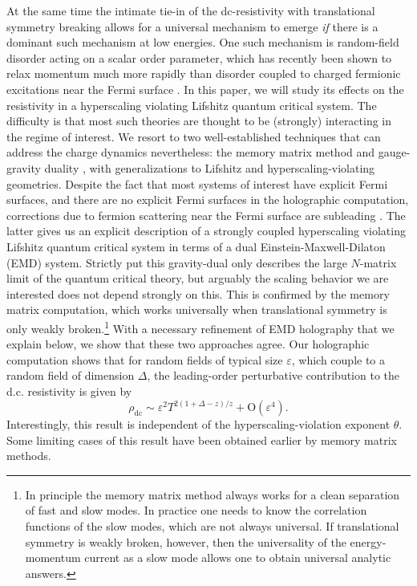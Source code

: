 \documentclass[10pt, oneside]{book}
\begin{document}
\begin{doublespace}
At the same time the intimate tie-in of the dc-resistivity with translational symmetry breaking allows for a universal mechanism to emerge {\em if} there is a dominant such mechanism at low energies. One such mechanism is random-field disorder acting on a scalar order parameter, which has recently been shown to relax momentum much more rapidly than disorder coupled to charged fermionic excitations near the Fermi surface \cite{Hartnoll:2014gba}. In this paper, we will study its effects on the resistivity in a hyperscaling violating Lifshitz quantum critical system. The difficulty is that most such theories are thought to be (strongly) interacting in the regime of interest. We resort to two well-established techniques that can address the charge dynamics nevertheless: the memory matrix method \cite{forster1995} and gauge-gravity duality \cite{Hartnoll:2009sz, McGreevy:2009xe, Sachdev:2011wg}, with generalizations to Lifshitz \cite{Kachru:2008yh} and hyperscaling-violating \cite{Gubser:2009qt,Charmousis:2010zz,Iizuka:2011hg,Huijse:2011ef,Dong:2012se} geometries.  Despite the fact that most systems of
interest have explicit Fermi surfaces, and there are no
explicit Fermi surfaces in the holographic computation,
corrections due to fermion scattering near the Fermi surface
are subleading \cite{Hartnoll:2014gba}. The latter gives us an explicit description of a strongly coupled hyperscaling violating Lifshitz quantum critical system in terms of a dual Einstein-Maxwell-Dilaton (EMD) system. Strictly put this gravity-dual only describes the large $N$-matrix limit of the quantum critical theory, but arguably the scaling behavior we are interested does not depend strongly on this. This is confirmed by the memory matrix computation, which works universally when translational symmetry is only weakly broken.\footnote{In principle the memory matrix method always works for a clean separation of fast and slow modes. In practice one needs to know the correlation functions of the slow modes, which are not always universal. If translational symmetry is weakly broken, however, then the universality of the energy-momentum current as a slow mode allows one to obtain universal analytic answers.}  %
With a necessary refinement of EMD holography that we explain below, we show that these two approaches agree.
Our holographic computation shows that
  for random fields of typical size $\varepsilon$, which couple to a random field of dimension $\Delta$, the leading-order perturbative contribution to the d.c. resistivity is given by 
\begin{equation}
{\rho_{\mathrm{dc}} \sim \varepsilon^2 T^{2(1+\Delta-z)/z} + \mathrm{O}\left(\varepsilon^4\right). } \label{rhodc}
\end{equation}
Interestingly, this result is independent of the hyperscaling-violation exponent $\theta$.   Some limiting cases of this result have been obtained earlier \cite{hkms, Hartnoll:2008hs} by memory matrix methods.


\end{doublespace}
\end{document}
